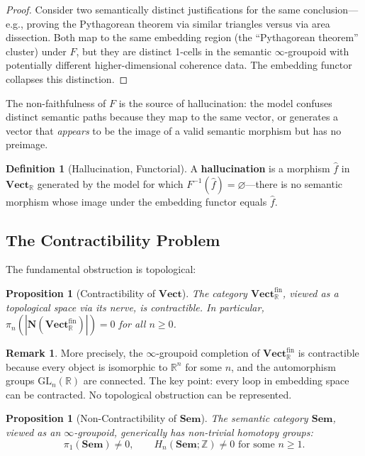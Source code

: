 \documentclass[11pt,a4paper,twocolumn]{article}
\theoremstyle{plain}
\newtheorem{proposition}[theorem]{Proposition}
\theoremstyle{definition}
\newtheorem{definition}[theorem]{Definition}
\newtheorem{remark}[theorem]{Remark}
\newcommand{\Sem}{\mathbf{Sem}}
\newcommand{\Vect}{\mathbf{Vect}}
\begin{document}
\begin{proof}
Consider two semantically distinct justifications for the same conclusion---e.g., proving the Pythagorean theorem via similar triangles versus via area dissection. Both map to the same embedding region (the ``Pythagorean theorem'' cluster) under $F$, but they are distinct 1-cells in the semantic $\infty$-groupoid with potentially different higher-dimensional coherence data. The embedding functor collapses this distinction.
\end{proof}

The non-faithfulness of $F$ is the source of hallucination: the model confuses distinct semantic paths because they map to the same vector, or generates a vector that \emph{appears} to be the image of a valid semantic morphism but has no preimage.

\begin{definition}[Hallucination, Functorial]\label{def:halluc-functor}
A \textbf{hallucination} is a morphism $\hat{f}$ in $\Vect_{\mathbb{R}}$ generated by the model for which $F^{-1}(\hat{f}) = \varnothing$---there is no semantic morphism whose image under the embedding functor equals $\hat{f}$.
\end{definition}

\subsection{The Contractibility Problem}

The fundamental obstruction is topological:

\begin{proposition}[Contractibility of $\Vect$]\label{prop:contract}
The category $\Vect_{\mathbb{R}}^{\mathrm{fin}}$, viewed as a topological space via its nerve, is contractible. In particular, $\pi_n(|\mathbf{N}(\Vect_{\mathbb{R}}^{\mathrm{fin}})|) = 0$ for all $n \geq 0$.
\end{proposition}

\begin{remark}
More precisely, the $\infty$-groupoid completion of $\Vect_{\mathbb{R}}^{\mathrm{fin}}$ is contractible because every object is isomorphic to $\mathbb{R}^n$ for some $n$, and the automorphism groups $\mathrm{GL}_n(\mathbb{R})$ are connected. The key point: every loop in embedding space can be contracted. No topological obstruction can be represented.
\end{remark}

\begin{proposition}[Non-Contractibility of $\Sem$]\label{prop:noncontract}
The semantic category $\Sem$, viewed as an $\infty$-groupoid, generically has non-trivial homotopy groups:
\[
  \pi_1(\Sem) \neq 0, \qquad H_n(\Sem; \mathbb{Z}) \neq 0 \text{ for some } n \geq 1.
\]
\end{proposition}
\end{document}
